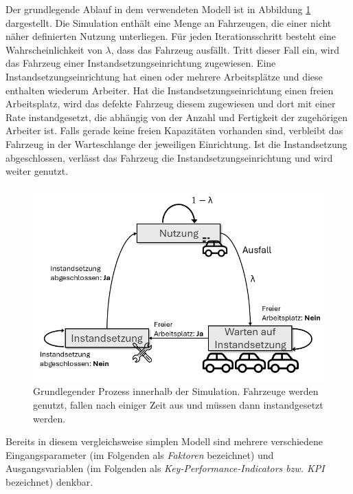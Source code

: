 \documentclass[11pt,a4paper]{article}
\begin{document}
Der grundlegende Ablauf in dem verwendeten Modell ist in Abbildung \ref{fig:Simulationsmodell} dargestellt.
Die Simulation enthält eine Menge an Fahrzeugen, die einer nicht näher definierten Nutzung unterliegen. 
Für jeden Iterationsschritt besteht eine Wahrscheinlichkeit von $\lambda$, dass das Fahrzeug ausfällt.
Tritt dieser Fall ein, wird das Fahrzeug einer Instandsetzungseinrichtung zugewiesen. 
Eine Instandsetzungseinrichtung hat einen oder mehrere Arbeitsplätze und diese enthalten wiederum Arbeiter.
Hat die Instandsetzungseinrichtung einen freien Arbeitsplatz, wird das defekte Fahrzeug diesem zugewiesen und
dort mit einer Rate instandgesetzt, die abhängig von der Anzahl und Fertigkeit der zugehörigen Arbeiter ist.
Falls gerade keine freien Kapazitäten vorhanden sind, verbleibt das Fahrzeug in der Warteschlange der jeweiligen Einrichtung.
Ist die Instandsetzung abgeschlossen, verlässt das Fahrzeug die Instandsetzungseinrichtung und wird weiter genutzt.

\begin{figure}
	\label{fig:Simulationsmodell}
	\centering
	\includegraphics[width=\textwidth]{media/Simulationsmodell.png}
	\caption{
		Grundlegender Prozess innerhalb der Simulation. Fahrzeuge werden
		genutzt, fallen nach einiger Zeit aus und müssen dann instandgesetzt
		werden.
	}
\end{figure}

Bereits in diesem vergleichsweise simplen Modell sind mehrere verschiedene Eingangsparameter (im Folgenden als \emph{Faktoren} bezeichnet)
und Ausgangsvariablen (im Folgenden als \emph{Key-Performance-Indicators bzw. KPI} bezeichnet) denkbar.
\end{document}
